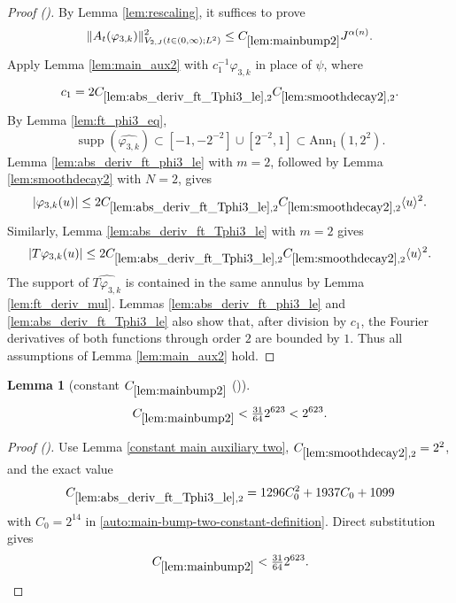 \documentclass[12pt,reqno]{amsart}
\newcommand{\auto}{{({\tiny\faCar})}}
\theoremstyle{plain}
\newtheorem{lemma}[theorem]{Lemma}
\numberwithin{equation}{section}
\theoremstyle{remark}
\newcommand{\using}[1]{}
\begin{document}
\begin{proof}[Proof \auto]
By Lemma \ref{lem:rescaling}, it suffices to prove
\begin{equation}\label{mainbump2_1}
\|A_t(\varphi_{3,k})\|_{V_{2,J}(t\in(0,\infty);L^2)}^2
\le C_{\ref{lem:mainbump2}}J^{\alpha(n)}.
\end{equation}
Apply Lemma \ref{lem:main_aux2} with $c_1^{-1}\varphi_{3,k}$ in place of $\psi$, where
\[
c_1=2C_{\ref{lem:abs_deriv_ft_Tphi3_le},2}C_{\ref{lem:smoothdecay2},2}.
\]
By Lemma \ref{lem:ft_phi3_eq},
\begin{equation}\label{mainbump2_supp}
\operatorname{supp}(\widehat{\varphi_{3,k}})
\subset[-1,-2^{-2}]\cup[2^{-2},1]
\subset\mathrm{Ann}_1(1,2^2).
\end{equation}
Lemma \ref{lem:abs_deriv_ft_phi3_le} with $m=2$, followed by Lemma \ref{lem:smoothdecay2} with $N=2$, gives
\begin{equation}\label{mainbump2_dec1}
|\varphi_{3,k}(u)|
\le2C_{\ref{lem:abs_deriv_ft_Tphi3_le},2}C_{\ref{lem:smoothdecay2},2}\langle u\rangle^2.
\end{equation}
Similarly, Lemma \ref{lem:abs_deriv_ft_Tphi3_le} with $m=2$ gives
\begin{equation}\label{mainbump2_dec2}
|T\varphi_{3,k}(u)|
\le2C_{\ref{lem:abs_deriv_ft_Tphi3_le},2}C_{\ref{lem:smoothdecay2},2}\langle u\rangle^2.
\end{equation}
The support of $\widehat{T\varphi_{3,k}}$ is contained in the same annulus by Lemma \ref{lem:ft_deriv_mul}. Lemmas \ref{lem:abs_deriv_ft_phi3_le} and \ref{lem:abs_deriv_ft_Tphi3_le} also show that, after division by $c_1$, the Fourier derivatives of both functions through order $2$ are bounded by $1$. Thus all assumptions of Lemma \ref{lem:main_aux2} hold.
\end{proof}

\begin{lemma}[constant $C_{\ref{lem:mainbump2}}$ \auto]\label{constant main bump two}\using{constant main auxiliary two}\using{lem:abs_deriv_ft_Tphi3_le}\using{constant T phi three derivative}\using{lem:smoothdecay2}\using{lem:mainbump2}
\begin{equation}\label{constant main bump two bound}
C_{\ref{lem:mainbump2}}<\tfrac{31}{64}2^{623}<2^{623}.
\end{equation}
\end{lemma}
\begin{proof}[Proof \auto]
Use Lemma \ref{constant main auxiliary two}, $C_{\ref{lem:smoothdecay2},2}=2^2$, and the exact value
\[
C_{\ref{lem:abs_deriv_ft_Tphi3_le},2}
=1296C_0^2+1937C_0+1099
\]
with $C_0=2^{14}$ in \eqref{auto:main-bump-two-constant-definition}. Direct substitution gives
\[
C_{\ref{lem:mainbump2}}
<\tfrac{31}{64}2^{623}.
\]
\end{proof}
\end{document}

